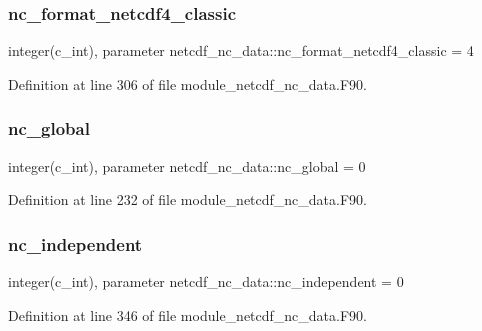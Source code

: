 \subsubsection{\texorpdfstring{nc\+\_\+format\+\_\+netcdf4\+\_\+classic}{nc\_format\_netcdf4\_classic}}
{\footnotesize\ttfamily integer(c\+\_\+int), parameter netcdf\+\_\+nc\+\_\+data\+::nc\+\_\+format\+\_\+netcdf4\+\_\+classic = 4}



Definition at line 306 of file module\+\_\+netcdf\+\_\+nc\+\_\+data.\+F90.

\mbox{\label{namespacenetcdf__nc__data_a541ff616daf713edea81d32a329af406}} 
\subsubsection{\texorpdfstring{nc\+\_\+global}{nc\_global}}
{\footnotesize\ttfamily integer(c\+\_\+int), parameter netcdf\+\_\+nc\+\_\+data\+::nc\+\_\+global = 0}



Definition at line 232 of file module\+\_\+netcdf\+\_\+nc\+\_\+data.\+F90.

\mbox{\label{namespacenetcdf__nc__data_afa082ef2e4964d0eab52a82d96737a43}} 
\subsubsection{\texorpdfstring{nc\+\_\+independent}{nc\_independent}}
{\footnotesize\ttfamily integer(c\+\_\+int), parameter netcdf\+\_\+nc\+\_\+data\+::nc\+\_\+independent = 0}



Definition at line 346 of file module\+\_\+netcdf\+\_\+nc\+\_\+data.\+F90.

\mbox{\label{namespacenetcdf__nc__data_a6590b555133bf817e31e28aee20f9393}} 
